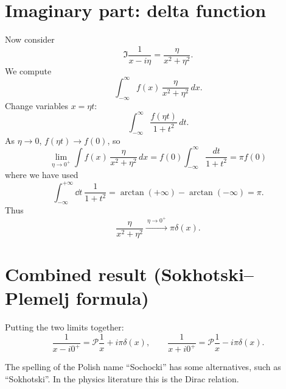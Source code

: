 \documentclass{article}
\theoremstyle{definition}
\theoremstyle{plain}
\numberwithin{equation}{section}
\begin{document}
\section{Imaginary part: delta function}

Now consider
\begin{equation}
\Im \frac{1}{x-i\eta} = \frac{\eta}{x^2+\eta^2}.
\end{equation}
We compute
\begin{equation}
\int_{-\infty}^{\infty} f(x)\,\frac{\eta}{x^2+\eta^2}\,dx.
\end{equation}
Change variables $x = \eta t$:
\begin{equation}
\int_{-\infty}^{\infty} \frac{f(\eta t)}{1+t^2}\,dt.
\end{equation}
As $\eta \to 0$, $f(\eta t)\to f(0)$, so
\begin{equation}
\lim_{\eta\to0^+}\int f(x)\,\frac{\eta}{x^2+\eta^2}\,dx = f(0)\int_{-\infty}^{\infty}\frac{dt}{1+t^2} = \pi f(0)
\end{equation}
where we have used
\[
    \int _{-\infty} ^{+\infty} \dd t\ 
    \frac{1}{1+t^{2}} 
    =
    \arctan(+\infty) - \arctan(-\infty)
    = \pi.
\]
Thus
\begin{equation}
\frac{\eta}{x^2+\eta^2} \xrightarrow{\ \eta \to 0^+\ } \pi \delta(x).
\end{equation}

\section{Combined result (Sokhotski--Plemelj formula)}

Putting the two limits together:
\begin{equation}
\frac{1}{x-i0^+} = \mathcal{P}\frac{1}{x} + i\pi \delta(x), \qquad
\frac{1}{x+i0^+} = \mathcal{P}\frac{1}{x} - i\pi \delta(x).
\end{equation}

The spelling of the Polish name ``Sochocki'' has some alternatives, 
such as ``Sokhotski''. In the physics literature this is the Dirac relation.

\printbibliography
\end{document}
